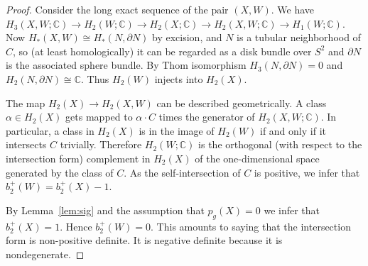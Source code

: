 \documentclass[11pt]{amsart}
\numberwithin{equation}{section}
\theoremstyle{plain}
\theoremstyle{definition}
\begin{document}
\begin{proof}
Consider the long exact sequence of the pair $(X,W)$. We have $H_3(X,W;{\mathbb C})\to H_2(W;{\mathbb C})\to H_2(X;{\mathbb C})\to H_2(X,W;{\mathbb C})\to H_1(W;{\mathbb C})$.
Now $H_*(X,W)\cong H_*(N,\partial N)$ by excision, and $N$ is a tubular neighborhood of $C$, so (at least homologically) it can be regarded
as a disk bundle over $S^2$ and $\partial N$ is the associated sphere bundle. By Thom isomorphism $H_3(N,\partial N)=0$ and $H_2(N,\partial N)\cong{\mathbb C}$. 
Thus $H_2(W)$ injects into $H_2(X)$.

The map $H_2(X)\to H_2(X,W)$ can be described geometrically. A class $\alpha\in H_2(X)$ gets mapped to
$\alpha\cdot C$ times the generator of $H_2(X,W;{\mathbb C})$. In particular, a class in $H_2(X)$ is in the image of $H_2(W)$ if and only if
it intersects $C$ trivially. Therefore $H_2(W;{\mathbb C})$ is the orthogonal (with respect to the intersection form) complement in $H_2(X)$
of the one-dimensional space generated by the class of $C$. As the self-intersection of $C$ is positive, we infer that $b_2^+(W)=b_2^+(X)-1$.

By Lemma~\ref{lem:sig} and the assumption that $p_g(X)=0$ we infer that $b_2^+(X)=1$. Hence $b_2^+(W)=0$. This amounts to saying
that the intersection form is non-positive definite. It is negative definite because it is nondegenerate.
\end{proof}
\end{document}
